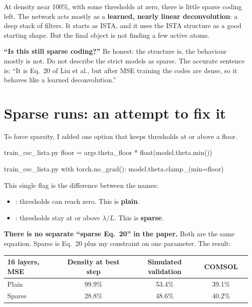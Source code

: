 At density near 100\%, with some thresholds at zero, there is little sparse coding left. The network acts
mostly as a \textbf{learned, nearly linear deconvolution}: a deep stack of filters. It starts as ISTA, and it uses
the ISTA structure as a good starting shape. But the final object is not finding a few active atoms.

\begin{defend}
\textbf{``Is this still sparse coding?''} Be honest: the structure is, the behaviour mostly is not. Do not
describe the strict models as sparse. The accurate sentence is: ``It is Eq.~20 of Liu et al., but
after MSE training the codes are dense, so it behaves like a learned deconvolution.''
\end{defend}

\section{Sparse runs: an attempt to fix it}

To force sparsity, I added one option that keeps thresholds at or above a floor.

\begin{code*}{train_csc_lista.py}
    floor = args.theta_floor * float(model.theta.min())
\end{code*}
\begin{code*}{train_csc_lista.py}
        with torch.no_grad():
            model.theta.clamp_(min=floor)
\end{code*}

This single flag is the difference between the names:

\begin{itemize}
\item {}: thresholds can reach zero. This is \textbf{plain}.
\item {}: thresholds stay at or above $\lambda/L$. This is \textbf{sparse}.
\end{itemize}

\textbf{There is no separate ``sparse Eq.~20'' in the paper.} Both are the same equation. Sparse is Eq.~20 plus my
constraint on one parameter. The result:

\begin{center}
\begin{tabular}{lcccc}
\toprule
16 layers, MSE & Density at best step & Simulated validation & COMSOL \\
\midrule
Plain & 99.9\% & 53.4\% & 39.1\% \\
Sparse & 28.8\% & 48.6\% & 40.2\% \\
\bottomrule
\end{tabular}
\end{center}

